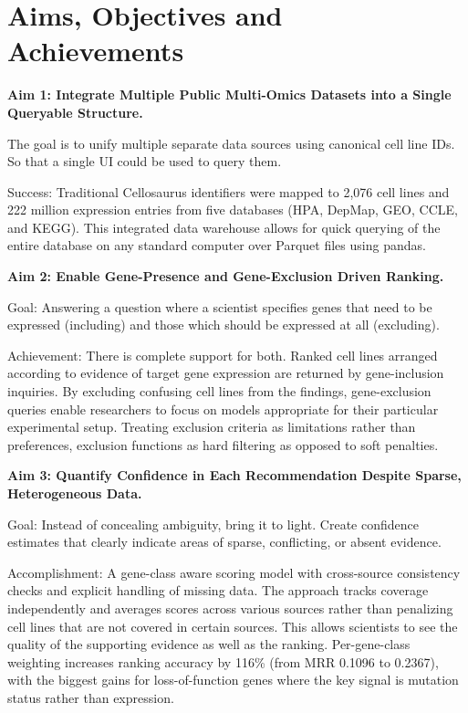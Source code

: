 \documentclass[author={Karen Coutinho, Ishaan Bhalla, Aman Raj, Dixit Kaloorani Malarmannan},
                supervisor={Dr. Daniel D'Andrea},
                degree={MSc},
                title={CellSelector Omics: A Multi-Omics Recommendation System for Cell Line Selection},
                subtitle={},
                type={},
                year={2026}]{dissertation}
\begin{document}
\section{Aims, Objectives and Achievements}

{\bf Aim 1: Integrate Multiple Public Multi-Omics Datasets into a Single Queryable Structure.}

The goal is to unify multiple separate data sources using canonical cell line IDs. So that a single UI could be used to query them.

Success: Traditional Cellosaurus identifiers were mapped to 2,076 cell lines and 222 million expression entries from five databases (HPA, DepMap, GEO, CCLE, and KEGG). This integrated data warehouse allows for quick querying of the entire database on any standard computer over Parquet files using pandas.

{\bf Aim 2: Enable Gene-Presence and Gene-Exclusion Driven Ranking.}

Goal: Answering a question where a scientist specifies genes that need to be expressed (including) and those which should be expressed at all (excluding).

Achievement: There is complete support for both. Ranked cell lines arranged according to evidence of target gene expression are returned by gene-inclusion inquiries. By excluding confusing cell lines from the findings, gene-exclusion queries enable researchers to focus on models appropriate for their particular experimental setup. Treating exclusion criteria as limitations rather than preferences, exclusion functions as hard filtering as opposed to soft penalties.

{\bf Aim 3: Quantify Confidence in Each Recommendation Despite Sparse, Heterogeneous Data.}

Goal: Instead of concealing ambiguity, bring it to light. Create confidence estimates that clearly indicate areas of sparse, conflicting, or absent evidence.

Accomplishment: A gene-class aware scoring model with cross-source consistency checks and explicit handling of missing data. The approach tracks coverage independently and averages scores across various sources rather than penalizing cell lines that are not covered in certain sources. This allows scientists to see the quality of the supporting evidence as well as the ranking. Per-gene-class weighting increases ranking accuracy by 116\% (from MRR 0.1096 to 0.2367), with the biggest gains for loss-of-function genes where the key signal is mutation status rather than expression.
\end{document}
